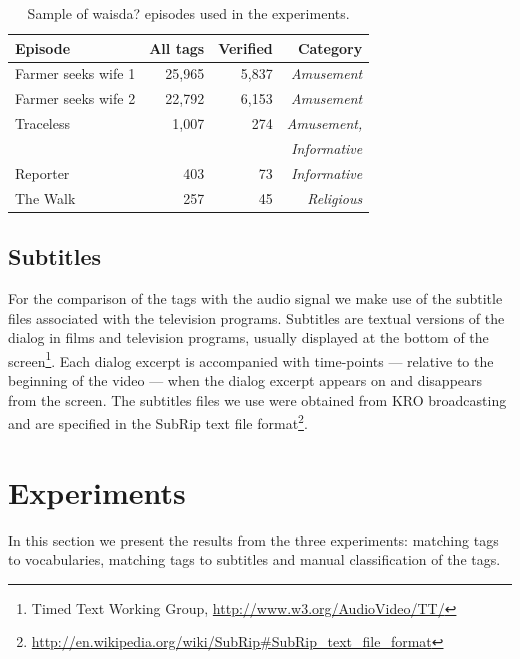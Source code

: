 \begin{table}[tb]
\centering
\begin{footnotesize}
\begin{tabular*}{\columnwidth}{@{\extracolsep{\fill}}lrrr}
\toprule
\textbf{Episode} \T \B & \textbf{All tags} & \textbf{Verified}&\textbf{Category} \\  
\midrule
Farmer seeks wife 1\B \T &25,965  & 5,837&\textit{Amusement}\\
Farmer seeks wife 2\B &22,792  &6,153  & \textit{Amusement}\\
Traceless\B& 1,007 &274& \textit{Amusement,}\\
&&& \textit{Informative}\\
Reporter\B&403& 73&\textit{Informative}\\
The Walk \B &257& 45&\textit{Religious}\\
\bottomrule
\end{tabular*}
\end{footnotesize}
\caption{Sample of waisda? episodes used in the experiments.}
\label{table:videos}
\end{table}

\subsection{Subtitles}\label{subtitles}

For the comparison of the tags with the audio signal we make use of the
subtitle files associated with the television programs. Subtitles are textual
versions of the dialog in films and television programs, usually displayed at
the bottom of the screen\footnote{Timed Text Working Group, \url{http://www.w3.org/AudioVideo/TT/}}. Each dialog excerpt is accompanied with
time-points --- relative to the beginning of the video --- when the dialog
excerpt appears on and disappears from the screen. The subtitles files we use
were obtained from KRO broadcasting and are specified in the SubRip text file
format\footnote{\url{http://en.wikipedia.org/wiki/SubRip\#SubRip\_text\_file\_format}}.

\section{Experiments}\label{sec:experiments}

In this section we present the results from the three experiments: matching
tags to vocabularies, matching tags to subtitles and manual classification of
the tags.


